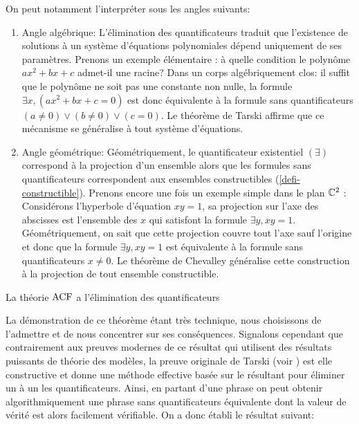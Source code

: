 On peut notamment l'interpréter sous les angles suivants:
\begin{enumerate}[label= (\roman*)]
    \item Angle algébrique: L'élimination des quantificateurs traduit que
    l'existence de solutions à un système d'équations polynomiales dépend
    uniquement de ses paramètres. Prenons un exemple élémentaire : à quelle
    condition le polynôme $ax^2+bx+c$ admet-il une racine? Dans un corps
    algébriquement clos: il suffit que le polynôme ne soit pas une constante non
    nulle, la formule $\exists x, (ax^2+bx+c = 0)$ est donc équivalente à la
    formule sans quantificateurs $(a \neq 0) \vee (b \neq 0) \vee (c = 0)$.
    Le théorème de Tarski affirme que ce mécanisme se généralise à tout système
    d'équations.

    \item Angle géométrique: Géométriquement, le quantificateur existentiel
    $(\exists)$ correspond à la projection d'un ensemble alors
    que les formules sans quantificateurs correspondent aux ensembles
    constructibles (\cref{defi-constructible}). Prenons encore une fois un
    exemple simple dans le plan $\mathbb{C}^2$ : Considérons l'hyperbole d'équation
    $xy=1$, sa projection sur l'axe des abscisses est l'ensemble des $x$ qui
    satisfont la formule $\exists y, xy= 1$. Géométriquement, on sait que cette
    projection couvre tout l'axe sauf l'origine et donc que la formule $\exists y, xy= 1$ est
    équivalente à la formule sans quantificateurs $x \neq 0$. Le théorème de
    Chevalley généralise cette construction à la projection de tout ensemble constructible.
\end{enumerate}

\begin{theo}\label{theo-acf-elim}
    La théorie $\operatorname{ACF}$ a l'élimination des quantificateurs
\end{theo}

La démonstration de ce théorème étant très technique, nous choisissons de
l'admettre et de nous concentrer sur ses conséquences. Signalons cependant que contrairement
aux preuves modernes de ce résultat qui utilisent des
résultats puissants de théorie des modèles, la preuve originale de Tarski (voir \cite{Tarski_1951}) est
elle constructive et donne une méthode effective basée sur le résultant pour
éliminer un à un les quantificateurs. Ainsi, en partant d'une phrase on
peut obtenir algorithmiquement une phrase sans quantificateurs équivalente dont
la valeur de vérité est alors facilement vérifiable. On a donc établi le
résultat suivant:


